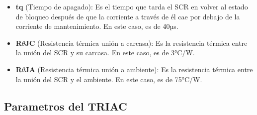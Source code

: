 \begin{itemize}
    \item \textbf{tq} (Tiempo de apagado): Es el tiempo que tarda el SCR en volver al estado de bloqueo después de que la corriente a través de él cae por debajo de la corriente de mantenimiento. En este caso, es de 40µs.
    \item \textbf{R$\theta$JC} (Resistencia térmica unión a carcasa): Es la resistencia térmica entre la unión del SCR y su carcasa. En este caso, es de 3°C/W.
    \item \textbf{R$\theta$JA} (Resistencia térmica unión a ambiente): Es la resistencia térmica entre la unión del SCR y el ambiente. En este caso, es de 75°C/W.
\end{itemize}

\subsection{Parametros del TRIAC}